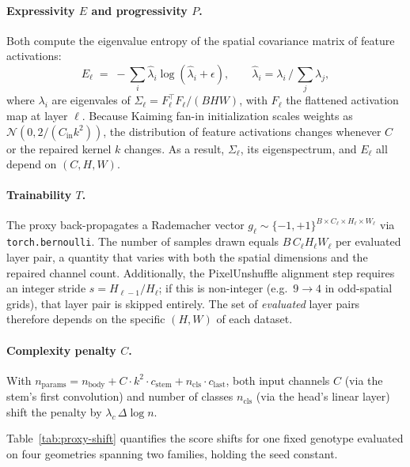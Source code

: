 \documentclass[10pt,twocolumn]{article}
\newcommand{\code}[1]{\texttt{\small #1}}
\begin{document}
\paragraph{Expressivity $E$ and progressivity $P$.} Both compute the
eigenvalue entropy of the spatial covariance matrix of feature activations:
\begin{equation}
E_\ell \;=\; -\!\sum_i \hat\lambda_i \log(\hat\lambda_i + \epsilon),
\qquad \hat\lambda_i = \lambda_i \,/\, \textstyle\sum_j \lambda_j,
\end{equation}
where $\lambda_i$ are eigenvales of
$\Sigma_\ell = F_\ell^\top F_\ell / (BHW)$, with $F_\ell$ the flattened
activation map at layer $\ell$.  Because Kaiming fan-in initialization scales
weights as $\mathcal{N}(0, 2/(C_{\text{in}}k^2))$, the distribution of feature
activations changes whenever $C$ or the repaired kernel $k$ changes.  As a
result, $\Sigma_\ell$, its eigenspectrum, and $E_\ell$ all depend on $(C,H,W)$.

\paragraph{Trainability $T$.} The proxy back-propagates a Rademacher vector
$g_\ell \!\sim\! \{-1,+1\}^{B \times C_\ell \times H_\ell \times W_\ell}$
via \code{torch.bernoulli}.  The number of samples drawn equals
$B\,C_\ell H_\ell W_\ell$ per evaluated layer pair, a quantity that varies
with both the spatial dimensions and the repaired channel count.  Additionally,
the PixelUnshuffle alignment step requires an integer stride
$s = H_{\ell-1}/H_\ell$; if this is non-integer (e.g.\ $9\!\to\!4$ in
odd-spatial grids), that layer pair is skipped entirely.  The set of
\emph{evaluated} layer pairs therefore depends on the specific $(H,W)$ of each
dataset.

\paragraph{Complexity penalty $C$.} With $n_{\text{params}} =
n_{\text{body}} + C\cdot k^2 \cdot c_{\text{stem}} +
n_{\text{cls}}\cdot c_{\text{last}}$, both input channels $C$ (via the stem's
first convolution) and number of classes $n_{\text{cls}}$ (via the head's
linear layer) shift the penalty by $\lambda_c\,\Delta\log n$.

Table~\ref{tab:proxy-shift} quantifies the score shifts for one fixed genotype
evaluated on four geometries spanning two families, holding the seed constant.
\end{document}
